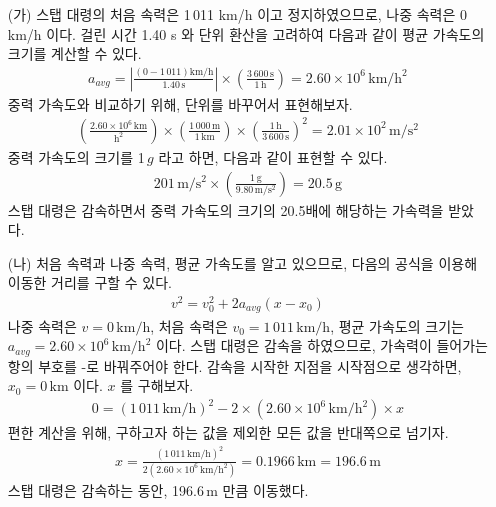 \documentclass[APS,floatfix,nofootinbib,superscriptaddress,fleqn,preprint]{revtex4}
\begin{document}
\begin{itemize}
  \item [(가)] 스탭 대령의 처음 속력은 1\,011 km/h 이고 정지하였으므로, 나중 속력은 0 km/h 이다. 걸린 시간 1.40 s 와 단위 환산을 고려하여 다음과 같이 평균 가속도의 크기를 계산할 수 있다.
  \begin{align}
    a_{avg} = \left|\frac{(0-1\,011)\mathrm{km/h}}{1.40 \,\mathrm{s}}\right|\times\left(\frac{3\,600\,\mathrm{s}}{1\,\mathrm{h}}\right)=2.60\times 10^6\,\mathrm{km/h^2}
  \end{align} 
  중력 가속도와 비교하기 위해, 단위를 바꾸어서 표현해보자.
  \begin{align}
    \left(\mathrm{\frac{2.60\times 10^6\,km}{h^2}}\right)\times\left(\mathrm{\frac{1\,000\,m}{1\,km}}\right)\times\mathrm{\left(\frac{1\,h}{3\,600\,s}\right)^2}=2.01\times 10^2\,\mathrm{m/s^2}
  \end{align}
  중력 가속도의 크기를 1\,$g$ 라고 하면, 다음과 같이 표현할 수 있다.
  \begin{align}
  \mathrm{201\,m/s^2}\times\left(\frac{1\,\mathrm{g}}{9.80\,\mathrm{m/s^2}}\right) = 20.5\,\mathrm{g}
  \end{align} 
  스탭 대령은 감속하면서 중력 가속도의 크기의 20.5배에 해당하는 가속력을 받았다.
  \item [(나)] 처음 속력과 나중 속력, 평균 가속도를 알고 있으므로, 다음의 공식을 이용해 이동한 거리를 구할 수 있다.
  \begin{align}
    v^2=v_0^2+2a_{avg}(x-x_0)
  \end{align}
  나중 속력은 $v=\mathrm{0\,km/h}$, 처음 속력은 $v_0=\mathrm{1\,011\,km/h}$, 평균 가속도의 크기는 $a_{avg}=2.60\times 10^6\,\mathrm{km/h^2}$ 이다. 스탭 대령은 감속을 하였으므로, 가속력이 들어가는 항의 부호를 -로 바꿔주어야 한다. 감속을 시작한 지점을 시작점으로 생각하면, $x_0=0\,\mathrm{km}$ 이다. $x$ 를 구해보자.
  \begin{align}
    0=\left(\mathrm{1\,011\,km/h}\right)^2-2\times\left(2.60\times 10^6\,\mathrm{km/h^2}\right)\times x
  \end{align}    
  편한 계산을 위해, 구하고자 하는 값을 제외한 모든 값을 반대쪽으로 넘기자.
  \begin{align}    
    x=\frac{\left(\mathrm{1\,011\,km/h}\right)^2}{2\left(2.60\times 10^6\,\mathrm{km/h^2}\right)}=0.1966\,\mathrm{km}=196.6\,\mathrm{m}
  \end{align}
  스탭 대령은 감속하는 동안, 196.6\,m 만큼 이동했다.
\end{itemize}

\newpage
\end{document}
